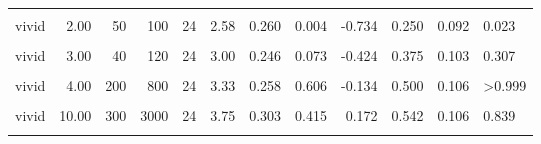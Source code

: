 \documentclass[
]{article}
\begin{document}
\begin{longtable}[t]{lrrrrrrlrrrl}
\hspace{1em}\cellcolor{gray!10}{vivid} & \cellcolor{gray!10}{2.00} & \cellcolor{gray!10}{20} & \cellcolor{gray!10}{40} & \cellcolor{gray!10}{9} & \cellcolor{gray!10}{2.11} & \cellcolor{gray!10}{0.328} & \cellcolor{gray!10}{0.013} & \cellcolor{gray!10}{-1.497} & \cellcolor{gray!10}{0.111} & \cellcolor{gray!10}{0.118} & \cellcolor{gray!10}{0.039}\\
\hspace{1em}vivid & 2.00 & 50 & 100 & 24 & 2.58 & 0.260 & 0.004 & -0.734 & 0.250 & 0.092 & 0.023\\
\hspace{1em}\cellcolor{gray!10}{vivid} & \cellcolor{gray!10}{3.00} & \cellcolor{gray!10}{10} & \cellcolor{gray!10}{30} & \cellcolor{gray!10}{9} & \cellcolor{gray!10}{2.56} & \cellcolor{gray!10}{0.437} & \cellcolor{gray!10}{0.082} & \cellcolor{gray!10}{-0.764} & \cellcolor{gray!10}{0.333} & \cellcolor{gray!10}{0.177} & \cellcolor{gray!10}{0.508}\\
\hspace{1em}vivid & 3.00 & 40 & 120 & 24 & 3.00 & 0.246 & 0.073 & -0.424 & 0.375 & 0.103 & 0.307\\
\hspace{1em}\cellcolor{gray!10}{vivid} & \cellcolor{gray!10}{4.00} & \cellcolor{gray!10}{20} & \cellcolor{gray!10}{80} & \cellcolor{gray!10}{9} & \cellcolor{gray!10}{3.00} & \cellcolor{gray!10}{0.500} & \cellcolor{gray!10}{0.333} & \cellcolor{gray!10}{-0.354} & \cellcolor{gray!10}{0.333} & \cellcolor{gray!10}{0.177} & \cellcolor{gray!10}{0.508}\\
\hspace{1em}vivid & 4.00 & 200 & 800 & 24 & 3.33 & 0.258 & 0.606 & -0.134 & 0.500 & 0.106 & >0.999\\
\hspace{1em}\cellcolor{gray!10}{vivid} & \cellcolor{gray!10}{10.00} & \cellcolor{gray!10}{40} & \cellcolor{gray!10}{400} & \cellcolor{gray!10}{9} & \cellcolor{gray!10}{3.67} & \cellcolor{gray!10}{0.395} & \cellcolor{gray!10}{0.626} & \cellcolor{gray!10}{0.149} & \cellcolor{gray!10}{0.667} & \cellcolor{gray!10}{0.177} & \cellcolor{gray!10}{0.508}\\
\hspace{1em}vivid & 10.00 & 300 & 3000 & 24 & 3.75 & 0.303 & 0.415 & 0.172 & 0.542 & 0.106 & 0.839\\
\hspace{1em}\cellcolor{gray!10}{vivid} & \cellcolor{gray!10}{15.00} & \cellcolor{gray!10}{20} & \cellcolor{gray!10}{300} & \cellcolor{gray!10}{24} & \cellcolor{gray!10}{3.75} & \cellcolor{gray!10}{0.296} & \cellcolor{gray!10}{0.375} & \cellcolor{gray!10}{0.176} & \cellcolor{gray!10}{0.542} & \cellcolor{gray!10}{0.106} & \cellcolor{gray!10}{0.839}\\

\end{longtable}
\end{document}
